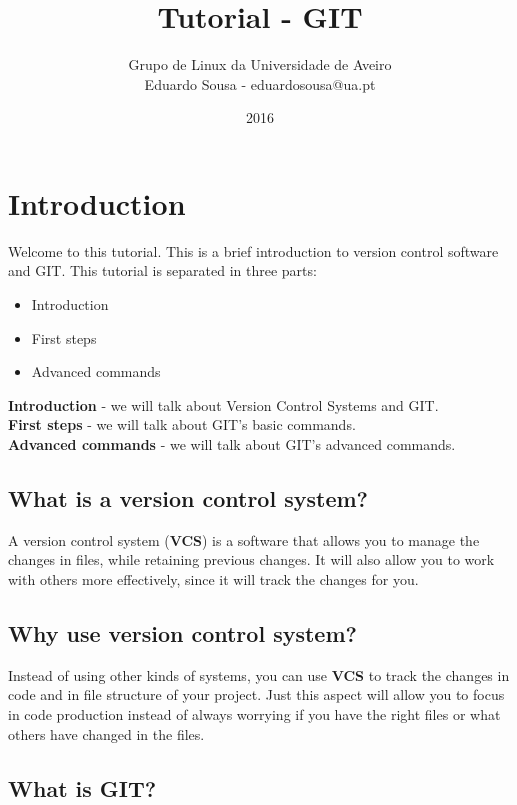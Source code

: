 \documentclass{article}
\title{Tutorial - GIT}
\author{Grupo de Linux da Universidade de Aveiro\\Eduardo Sousa - eduardosousa@ua.pt}
\date{2016}
\begin{document}
\maketitle

\section{Introduction}

Welcome to this tutorial. This is a brief introduction to version control software and GIT. This tutorial is separated in three parts:

\begin{itemize}
\item{Introduction}
\item{First steps}
\item{Advanced commands}
\end{itemize}

\textbf{Introduction} - we will talk about Version Control Systems and GIT.\\
\textbf{First steps} - we will talk about GIT's basic commands.\\
\textbf{Advanced commands} - we will talk about GIT's advanced commands.\\

\subsection{What is a version control system?}

A version control system (\textbf{VCS}) is a software that allows you to manage the changes in files, while retaining previous changes. It will also allow you to work with others more effectively, since it will track the changes for you.

\subsection{Why use version control system?}

Instead of using other kinds of systems, you can use \textbf{VCS} to track the changes in code and in file structure of your project. Just this aspect will allow you to focus in code production instead of always worrying if you have the right files or what others have changed in the files.

\subsection{What is GIT?}
\end{document}
